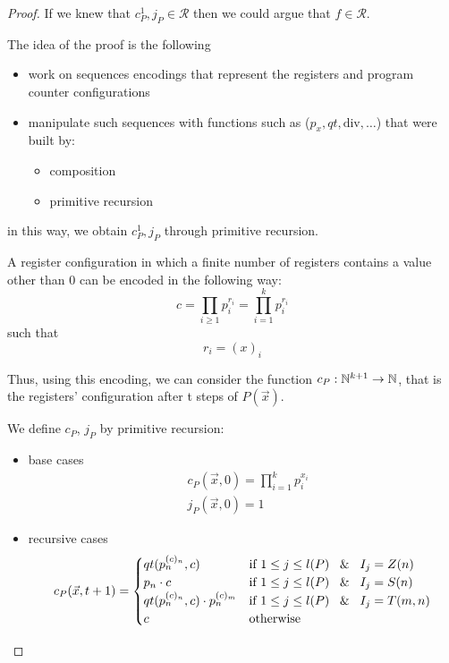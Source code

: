 \begin{theorem}
\begin{proof}

    If we knew that $c_P^1, j_P \in \mathcal{R}$ then we could argue that $f \in \mathcal{R}$.

    The idea of the proof is the following
    \begin{itemize}
    \item work on sequences encodings that represent the registers and program counter configurations
    \item manipulate such sequences with functions such as ($p_x, qt, \text{div}, \dots$) that were built by:
      \begin{itemize}
      \item composition
      \item primitive recursion
      \end{itemize}
    \end{itemize}
    in this way, we obtain $c_P^1, j_P$ through primitive recursion.
    
    A register configuration in which a finite number of registers
    contains a value other than 0 can be encoded in the following way:
    \begin{equation*}
      c = \prod\limits_{i \geq 1}p_i^{r_i} = \prod\limits_{i = 1}^{k}p_i^{r_i}
    \end{equation*}
    such that
    \begin{equation*}
      r_i = (x)_i
    \end{equation*}

    Thus, using this encoding, we can consider the function $c_P:\mathbb{N}^{k+1} \rightarrow \mathbb{N}$,
    that is the registers' configuration after t steps of $P(\vec{x})$. 

    We define $c_P$, $j_P$ by primitive recursion:
    \begin{itemize}
      \item base cases \begin{align*}
        &c_P(\vec{x}, 0) = \prod\limits_{i=1}^k p_i^{x_i}\\
        &j_P(\vec{x}, 0) = 1
      \end{align*}
      \item recursive cases   
      \[
        c_P(\vec{x},t+1) = \begin{cases}
          qt(p_n^{(c)_n}, c)                    & \text{if }1 \leq j \leq l(P) \; \And \; I_j = Z(n) \\
          p_n \cdot c                           & \text{if }1 \leq j \leq l(P) \; \And \; I_j = S(n) \\
          qt(p_n^{(c)_n}, c)  \cdot p_n^{(c)_m} & \text{if }1 \leq j \leq l(P) \; \And \; I_j = T(m,n) \\
          c                                     & \text{otherwise}
        \end{cases}
      \]
  

\end{itemize}
\end{proof}
\end{theorem}
